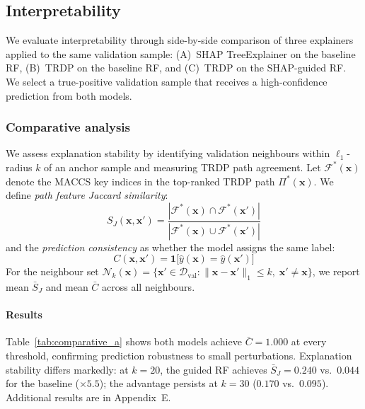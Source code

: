 \documentclass[letterpaper]{article} %
\begin{document}
\subsection{Interpretability}

We evaluate interpretability through side-by-side comparison of three explainers applied to the same validation sample: (A)~SHAP TreeExplainer on the baseline RF, (B)~TRDP on the baseline RF, and (C)~TRDP on the SHAP-guided RF.  We select a true-positive validation sample that receives a high-confidence prediction from both models.

\subsubsection{Comparative analysis}
We assess explanation stability by identifying validation neighbours within $\ell_1$-radius $k$ of an anchor sample and measuring TRDP path agreement. Let $\mathcal{F}^*(\mathbf{x})$ denote the MACCS key indices in the top-ranked TRDP path $\Pi^*(\mathbf{x})$. We define \emph{path feature Jaccard similarity}:
\begin{equation}
    S_J(\mathbf{x}, \mathbf{x}') = \frac{|\mathcal{F}^*(\mathbf{x}) \cap \mathcal{F}^*(\mathbf{x}')|}{|\mathcal{F}^*(\mathbf{x}) \cup \mathcal{F}^*(\mathbf{x}')|}
    \label{eq:jaccard}
\end{equation}
and the \emph{prediction consistency} as whether the model assigns the same label:
\begin{equation}
    C(\mathbf{x}, \mathbf{x}') = \mathbf{1}\bigl[\hat{y}(\mathbf{x}) = \hat{y}(\mathbf{x}')\bigr]
    \label{eq:pred_consist}
\end{equation}
For the neighbour set $\mathcal{N}_k(\mathbf{x}) = \{\mathbf{x}' \in \mathcal{D}_{\text{val}} : \|\mathbf{x} - \mathbf{x}'\|_1 \leq k,\; \mathbf{x}' \neq \mathbf{x}\}$, we report mean $\bar{S}_J$ and mean $\bar{C}$ across all neighbours.

\paragraph{Results}
Table~\ref{tab:comparative_a} shows both models achieve $\bar{C}=1.000$ at every threshold, confirming prediction robustness to small perturbations. Explanation stability differs markedly: at $k=20$, the guided RF achieves $\bar{S}_J=0.240$ vs.\ $0.044$ for the baseline (${\times}5.5$); the advantage persists at $k=30$ ($0.170$ vs.\ $0.095$). Additional results are in Appendix~E.
\end{document}
